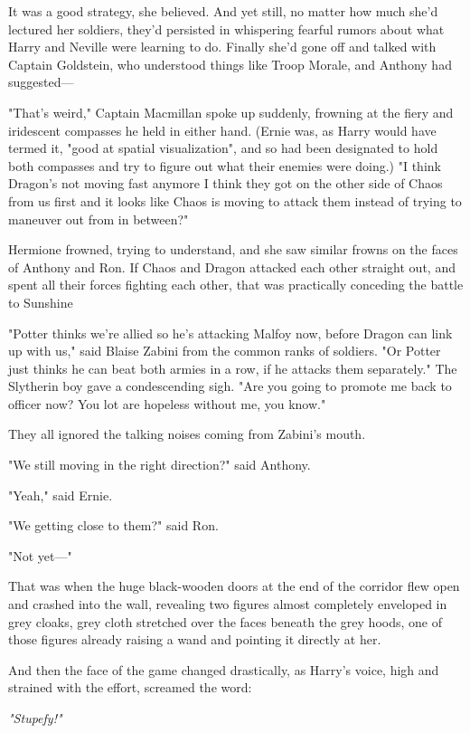 It was a good strategy, she believed. And yet still, no matter how much she'd
lectured her soldiers, they'd persisted in whispering fearful rumors about what
Harry and Neville were learning to do. Finally she'd gone off and talked with
Captain Goldstein, who understood things like Troop Morale, and Anthony had
suggested\mbox{---}

"That's weird," Captain Macmillan spoke up suddenly, frowning at the fiery and
iridescent compasses he held in either hand. (Ernie was, as Harry would have
termed it, "good at spatial visualization", and so had been designated to hold
both compasses and try to figure out what their enemies were doing.) "I
think{\el} Dragon's not moving fast anymore{\el} I think they got on the
other side of Chaos from us first{\el} and it looks like Chaos is moving to
attack them instead of trying to maneuver out from in between?"

Hermione frowned, trying to understand, and she saw similar frowns on the faces
of Anthony and Ron. If Chaos and Dragon attacked each other straight out, and
spent all their forces fighting each other, that was practically conceding the
battle to Sunshine{\el}

"Potter thinks we're allied so he's attacking Malfoy now, before Dragon can
link up with us," said Blaise Zabini from the common ranks of soldiers. "Or
Potter just thinks he can beat both armies in a row, if he attacks them
separately." The Slytherin boy gave a condescending sigh. "Are you going to
promote me back to officer now? You lot are hopeless without me, you know."

They all ignored the talking noises coming from Zabini's mouth.

"We still moving in the right direction?" said Anthony.

"Yeah," said Ernie.

"We getting close to them?" said Ron.

"Not yet\mbox{---}"

That was when the huge black-wooden doors at the end of the corridor flew open
and crashed into the wall, revealing two figures almost completely enveloped in
grey cloaks, grey cloth stretched over the faces beneath the grey hoods, one of
those figures already raising a wand and pointing it directly at her.

And then the face of the game changed drastically, as Harry's voice, high and
strained with the effort, screamed the word:

\emph{"Stupefy!"}

